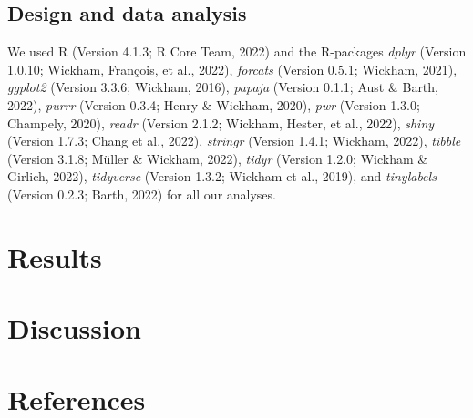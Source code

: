 \documentclass[
  man,floatsintext]{apa6}
\begin{document}
\hypertarget{design-and-data-analysis}{%
\subsection{Design and data analysis}\label{design-and-data-analysis}}

We used R (Version 4.1.3; R Core Team, 2022) and the R-packages \emph{dplyr} (Version 1.0.10; Wickham, François, et al., 2022), \emph{forcats} (Version 0.5.1; Wickham, 2021), \emph{ggplot2} (Version 3.3.6; Wickham, 2016), \emph{papaja} (Version 0.1.1; Aust \& Barth, 2022), \emph{purrr} (Version 0.3.4; Henry \& Wickham, 2020), \emph{pwr} (Version 1.3.0; Champely, 2020), \emph{readr} (Version 2.1.2; Wickham, Hester, et al., 2022), \emph{shiny} (Version 1.7.3; Chang et al., 2022), \emph{stringr} (Version 1.4.1; Wickham, 2022), \emph{tibble} (Version 3.1.8; Müller \& Wickham, 2022), \emph{tidyr} (Version 1.2.0; Wickham \& Girlich, 2022), \emph{tidyverse} (Version 1.3.2; Wickham et al., 2019), and \emph{tinylabels} (Version 0.2.3; Barth, 2022) for all our analyses.

\hypertarget{results}{%
\section{Results}\label{results}}

\hypertarget{discussion}{%
\section{Discussion}\label{discussion}}

\newpage

\hypertarget{references}{%
\section{References}\label{references}}
\end{document}
